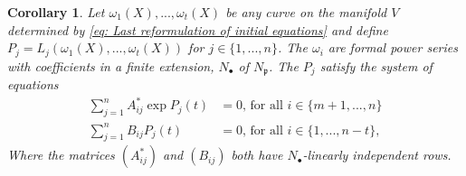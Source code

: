 \documentclass{article}
\newtheorem{corollary}{Corollary}[section]
\newcommand{\mfrak}[1]{\mathfrak{#1}}
\begin{document}
\begin{corollary}\label{cor: Any curve on V gives a solution to a system of equations}
    Let $\omega_1(X), ..., \omega_t(X)$ be any curve on the manifold $V$ determined by \cref{eq: Last reformulation of initial equations} and define $P_j = L_j(\omega_1(X), ..., \omega_t(X))$ for $j \in \{1, ..., n\}$. The $\omega_i$ are formal power series with coefficients in a finite extension, $N_\bullet$ of $N_\mfrak p$. The $P_j$ satisfy the system of equations
    \begin{equation}\label{eq: System that can also be solved}\tag{$\triangle$}
    \begin{aligned}
        \sum_{j=1}^n A^*_{ij}\exp P_j(t) &= 0 \text{, for all } i \in \{ m+1, ..., n \} \\
        \sum_{j=1}^n B_{ij}P_j(t) &= 0 \text{, for all } i \in \{1,  ..., n-t\},
    \end{aligned}
\end{equation}
    Where the matrices $(A^*_{ij})$ and $(B_{ij})$ both have $N_\bullet$-linearly independent rows.
\end{corollary}
\end{document}
